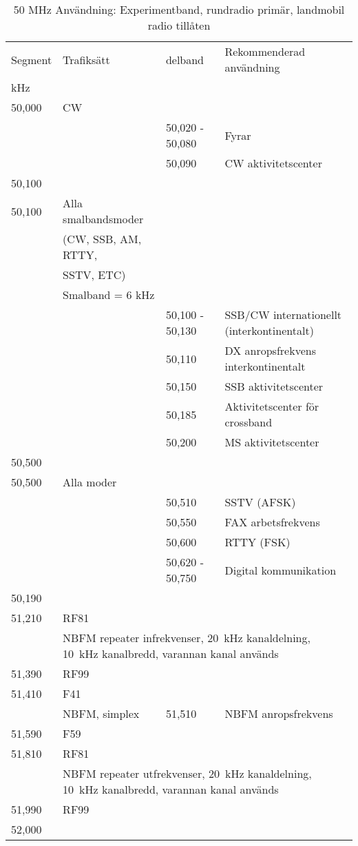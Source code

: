 \setlongtables
\begin{longtable}{llll}
\caption{50 MHz Användning: Experimentband, rundradio primär, landmobil radio tillåten} \\
Segment & Trafiksätt & delband & Rekommenderad användning \\
kHz     &            &         & \\ \hline
\endhead
50,000 & CW &                 & \\
       &    & 50,020 - 50,080 & Fyrar \\
       &    & 50,090          & CW aktivitetscenter \\
50,100 &    &                 & \\ \hline

50,100 & Alla smalbandsmoder & & \\
       & (CW, SSB, AM, RTTY, & & \\
       & SSTV, ETC)          & & \\
       & Smalband = 6 kHz    & & \\
       &    & 50,100 - 50,130 & SSB/CW internationellt (interkontinentalt) \\
       &    & 50,110          & DX anropsfrekvens interkontinentalt \\
       &    & 50,150          & SSB aktivitetscenter \\
       &    & 50,185          & Aktivitetscenter för crossband \\
       &    & 50,200          & MS aktivitetscenter \\
50,500 &    &                 & \\ \hline

50,500 & Alla moder & & \\
       &    & 50,510          & SSTV (AFSK) \\
       &    & 50,550          & FAX arbetsfrekvens \\
       &    & 50,600          & RTTY (FSK) \\
       &    & 50,620 - 50,750 & Digital kommunikation \\
50,190 &    &   & \\ \hline

51,210 & RF81 & & \\
       & \multicolumn{3}{l}{NBFM repeater infrekvenser, 20~kHz kanaldelning, 10~kHz kanalbredd, varannan kanal används} \\
51,390 & RF99 & & \\ \hline

51,410 & F41 & & \\
       & NBFM, simplex & 51,510 & NBFM anropsfrekvens\\
51,590 & F59 & & \\ \hline

51,810 & RF81 & & \\
       & \multicolumn{3}{l}{NBFM repeater utfrekvenser, 20~kHz kanaldelning, 10~kHz kanalbredd, varannan kanal används} \\
51,990 & RF99 & & \\
52,000 & & & \\
\end{longtable}

